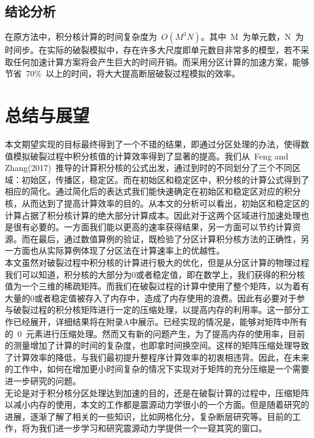 	\section{结论分析}
	\indent 在原方法中，积分核计算的时间复杂度为~$O(M^{3}N)$。其中~M~为单元数，N~为时间步。在实际的破裂模拟中，存在许多大尺度即单元数目非常多的模型，若不采取任何加速计算方案将会产生巨大的时间开销。而采用分区计算的加速方案，能够节省~70\%~以上的时间，将大大提高断层破裂过程模拟的效率。

\chapter{总结与展望}
\indent 本文期望实现的目标最终得到了一个不错的结果，即通过分区处理的办法，使得数值模拟破裂过程中积分核值的计算效率得到了显著的提高。我们从~Feng and Zhang(2017)~推导的计算积分核的公式出发，通过到时的不同划分了三个不同区域：初始区，传播区，稳定区。而在初始区和稳定区中，积分核的计算公式得到了相应的简化。通过简化后的表达式我们能快速确定在初始区和稳定区对应的积分核，从而达到了提高计算效率的目的。从本文的分析可以看出，初始区和稳定区的计算占据了积分核计算的绝大部分计算成本。因此对于这两个区域进行加速处理也是很有必要的。一方面我们能以更高的速率获得结果，另一方面可以节约计算资源。而在最后，通过数值算例的验证，既检验了分区计算积分核方法的正确性，另一方面也从实际算例体现了分区法在计算速率上的优越性。\\
\indent 本文虽然对破裂过程中积分核的计算进行极大的优化，但是从分区计算的物理过程我们可以知道，积分核的大部分为0或者稳定值，即在数学上，我们获得的积分核 值为一个三维的稀疏矩阵。而我们在破裂过程的计算中使用了整个矩阵，以为着有大量的0或者稳定值被存入了内存中，造成了内存使用的浪费。因此有必要对于参与破裂过程的积分核矩阵进行一定的压缩处理，以提高内存的利用率。这一部分工作已经展开，详细结果将在附录A中展示。已经实现的情况是，能够对矩阵中所有的~0~元素进行压缩处理。然而又有新的问题产生，为了提高内存的使用率，目前的测量增加了计算的时间的复杂度，也即拿时间换空间。这样的矩阵压缩处理导致了计算效率的降低，与我们最初提升整程序计算效率的初衷相违背。因此，在未来的工作中，如何在增加更小时间复杂的情况下实现对于矩阵的充分压缩是一个需要进一步研究的问题。\\
\indent 无论是对于积分核分区处理达到加速的目的，还是在破裂计算的过程中，压缩矩阵以减小内存的使用，本文的工作都是震源动力学很小的一个方面。但是随着研究的进展，逐渐了解了相关的一些知识，比如网格化分，复杂断层研究等。目前的工作，将为我们进一步学习和研究震源动力学提供一个一窥其究的窗口。





